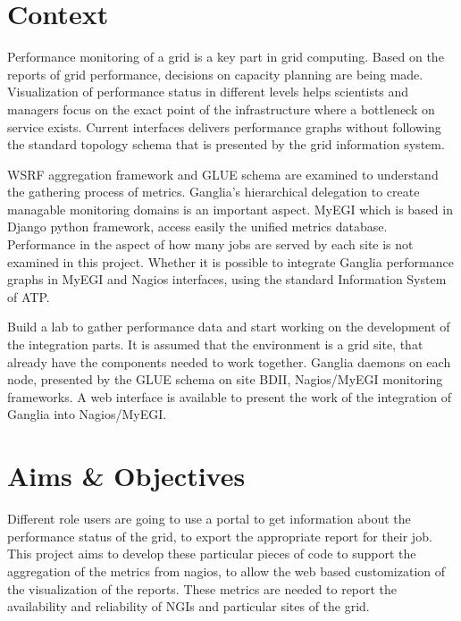 \section{Context}

Performance monitoring of a grid is a key part in grid computing. Based on the reports of grid performance, decisions on capacity planning are being made. Visualization of performance status in different levels helps scientists and managers focus on the exact point of the infrastructure where a bottleneck on service exists.
Current interfaces delivers performance graphs without following the standard topology schema that is presented by the grid information system.

WSRF aggregation framework and GLUE schema are examined to understand the gathering process of metrics. Ganglia's hierarchical delegation to create managable monitoring domains is an important aspect. MyEGI which is based in Django python framework, access easily the unified metrics database. 
Performance in the aspect of how many jobs are served by each site is not examined in this project.
Whether it is possible to integrate Ganglia performance graphs in MyEGI and Nagios interfaces, using the standard Information System of ATP.

Build a lab to gather performance data and start working on the development of the integration parts.
It is assumed that the environment is a grid site, that already have the components needed to work together. Ganglia daemons on each node, presented by the GLUE schema on site BDII, Nagios/MyEGI monitoring frameworks.
A web interface is available to present the work of the integration of Ganglia into Nagios/MyEGI.


\section{Aims \& Objectives}

Different role users are going to use a portal to get information about the performance status of the grid, to export the appropriate report for their job. This project aims to develop these particular pieces of code to support the aggregation of the metrics from nagios, to allow the web based customization of the visualization of the reports. These metrics are needed to report the availability and reliability of NGIs and particular sites of the grid.

